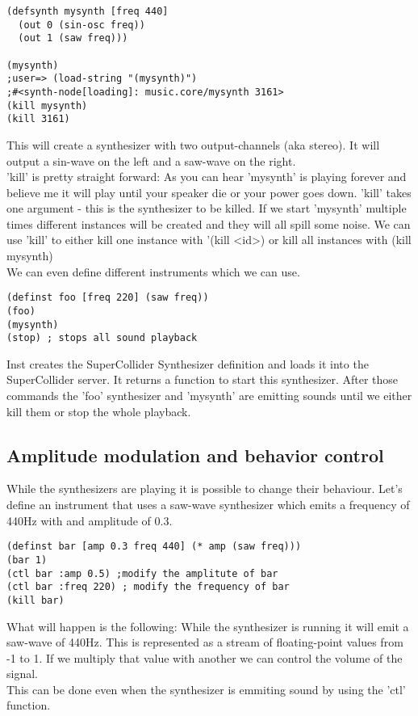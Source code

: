\begin{lstlisting}
(defsynth mysynth [freq 440]
  (out 0 (sin-osc freq))
  (out 1 (saw freq)))

(mysynth)
;user=> (load-string "(mysynth)")
;#<synth-node[loading]: music.core/mysynth 3161>
(kill mysynth)
(kill 3161)
\end{lstlisting}
This will create a synthesizer with two output-channels (aka stereo). It will output a sin-wave on the left and a saw-wave on the right.\\ 'kill' is pretty straight forward: As you can hear 'mysynth' is playing forever and believe me it will play until your speaker die or your power goes down. 'kill' takes one argument - this is the synthesizer to be killed. If we start 'mysynth' multiple times different instances will be created and they will all spill some noise. We can use 'kill' to either kill one instance with '(kill <id>) or kill all instances with (kill mysynth)\\

We can even define different instruments which we can use.
\begin{lstlisting}
(definst foo [freq 220] (saw freq))
(foo)
(mysynth)
(stop) ; stops all sound playback
\end{lstlisting}
Inst creates the SuperCollider Synthesizer definition and loads it into the SuperCollider server. It returns a function to start this synthesizer. After those commands the 'foo' synthesizer and 'mysynth' are emitting sounds until we either kill them or stop the whole playback.

\subsection{Amplitude modulation and behavior control}
While the synthesizers are playing it is possible to change their behaviour. Let's define an instrument that uses a saw-wave synthesizer which emits a frequency of 440Hz with and amplitude of 0.3.
\begin{lstlisting}
(definst bar [amp 0.3 freq 440] (* amp (saw freq)))
(bar 1)
(ctl bar :amp 0.5) ;modify the amplitute of bar
(ctl bar :freq 220) ; modify the frequency of bar
(kill bar)
\end{lstlisting}
What will happen is the following: While the synthesizer is running it will emit a saw-wave of 440Hz. This is represented as a stream of floating-point values from -1 to 1. If we multiply that value with another we can control the volume of the signal.\\ This can be done even when the synthesizer is emmiting sound by using the 'ctl' function.

